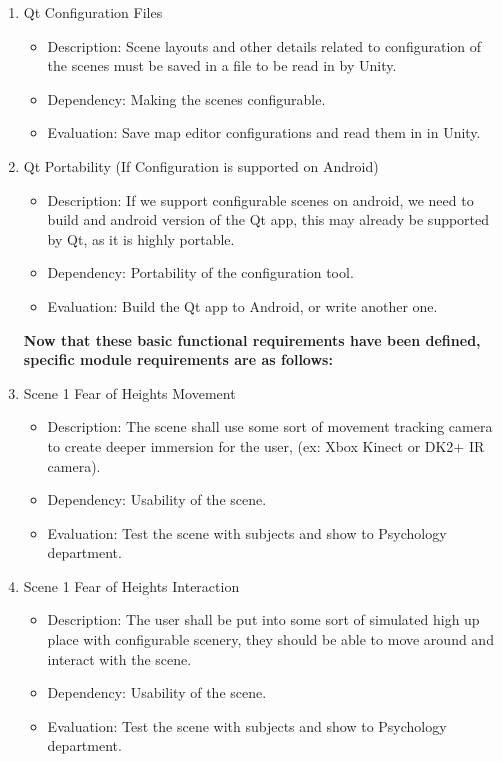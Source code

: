 \documentclass[a4paper,10pt]{article}
\begin{document}
\begin{enumerate}
		\item Qt Configuration Files
		\begin{itemize}
		\item Description: Scene layouts and other details related to configuration of the scenes must be saved in a file to be read in by Unity.
		\item Dependency:  Making the scenes configurable.
		\item Evaluation:  Save map editor configurations and read them in in Unity.
		\end{itemize}
		\item Qt Portability (If Configuration is supported on Android)
		\begin{itemize}
		\item Description: If we support configurable scenes on android, we need to build and android version of the Qt app, this may already be supported by Qt, as it is highly portable.
		\item Dependency:  Portability of the configuration tool.
		\item Evaluation:  Build the Qt app to Android, or write another one. 
		\end{itemize}
		\textbf{ Now that these basic functional requirements have been defined, specific module requirements are as follows:}
		
		\item Scene 1 Fear of Heights Movement 
		\begin{itemize}
		\item Description: The scene shall use some sort of movement tracking camera to create deeper immersion for the user, (ex: Xbox Kinect or DK2+ IR camera).
		\item Dependency: Usability of the scene.
		\item Evaluation: Test the scene with subjects and show to Psychology department. 
		\end{itemize}
		
		\item Scene 1 Fear of Heights Interaction 
		\begin{itemize}
		\item Description: The user shall be put into some sort of simulated high up place with configurable scenery, they should be able to move around and interact with the scene.
		\item Dependency: Usability of the scene.
		\item Evaluation: Test the scene with subjects and show to Psychology department. 
		\end{itemize}
		

\end{enumerate}
\end{document}
